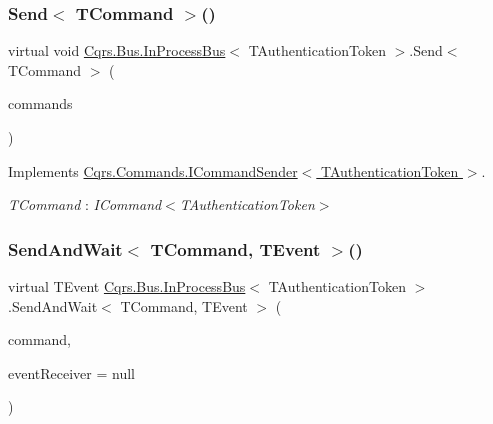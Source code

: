 \subsubsection{\texorpdfstring{Send$<$ T\+Command $>$()}{Send< TCommand >()}\hspace{0.1cm}{\footnotesize\ttfamily [2/2]}}
{\footnotesize\ttfamily virtual void \hyperlink{classCqrs_1_1Bus_1_1InProcessBus}{Cqrs.\+Bus.\+In\+Process\+Bus}$<$ T\+Authentication\+Token $>$.Send$<$ T\+Command $>$ (\begin{DoxyParamCaption}\item[{I\+Enumerable$<$ T\+Command $>$}]{commands }\end{DoxyParamCaption})\hspace{0.3cm}{\ttfamily [virtual]}}



Implements \hyperlink{interfaceCqrs_1_1Commands_1_1ICommandSender_a3fb3ec40a3e862f721a7c9204e67e832_a3fb3ec40a3e862f721a7c9204e67e832}{Cqrs.\+Commands.\+I\+Command\+Sender$<$ T\+Authentication\+Token $>$}.

\begin{Desc}
\item[Type Constraints]\begin{description}
\item[{\em T\+Command} : {\em I\+Command$<$T\+Authentication\+Token$>$}]\end{description}
\end{Desc}
\mbox{\label{classCqrs_1_1Bus_1_1InProcessBus_a506d617dc7ec3838791a91e09b73b8ce_a506d617dc7ec3838791a91e09b73b8ce}} 
\subsubsection{\texorpdfstring{Send\+And\+Wait$<$ T\+Command, T\+Event $>$()}{SendAndWait< TCommand, TEvent >()}\hspace{0.1cm}{\footnotesize\ttfamily [1/6]}}
{\footnotesize\ttfamily virtual T\+Event \hyperlink{classCqrs_1_1Bus_1_1InProcessBus}{Cqrs.\+Bus.\+In\+Process\+Bus}$<$ T\+Authentication\+Token $>$.Send\+And\+Wait$<$ T\+Command, T\+Event $>$ (\begin{DoxyParamCaption}\item[{T\+Command}]{command,  }\item[{\hyperlink{interfaceCqrs_1_1Events_1_1IEventReceiver}{I\+Event\+Receiver}$<$ T\+Authentication\+Token $>$}]{event\+Receiver = {\ttfamily null} }\end{DoxyParamCaption})\hspace{0.3cm}{\ttfamily [virtual]}}



